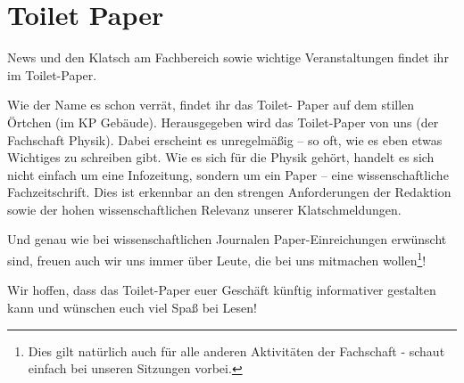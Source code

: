 \vspace{-6ex}
\section{Toilet Paper}
\vspace{-3ex}
\begin{multicols}{2}
News und den Klatsch am Fachbereich sowie wichtige Veranstaltungen findet ihr im Toilet-Paper.

Wie der Name es schon verrät, findet ihr das Toilet- Paper auf dem stillen Örtchen (im KP Gebäude).  
Herausgegeben wird das Toilet-Paper von uns (der Fachschaft Physik). Dabei erscheint es unregelmäßig – so oft, wie es eben etwas Wichtiges zu schreiben gibt. 
Wie es sich für die Physik gehört, handelt es sich nicht einfach um eine Infozeitung, sondern um ein Paper – eine wissenschaftliche Fachzeitschrift. Dies ist erkennbar an den strengen Anforderungen der Redaktion sowie der hohen wissenschaftlichen Relevanz unserer Klatschmeldungen.

Und genau wie bei wissenschaftlichen Journalen Paper-Einreichungen erwünscht sind, freuen auch wir uns immer über Leute, die bei uns mitmachen wollen\footnote{Dies gilt natürlich auch für alle anderen Aktivitäten der Fachschaft - schaut einfach bei unseren Sitzungen vorbei.}!

Wir hoffen, dass das Toilet-Paper euer Geschäft künftig informativer gestalten kann und wünschen euch viel Spaß bei Lesen! 
\end{multicols}
